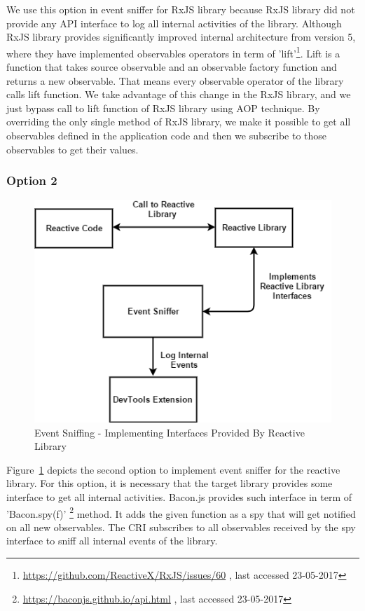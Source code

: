 We use this option in event sniffer for RxJS library because RxJS library did not provide any API interface to log all internal activities of the library.  
Although RxJS library provides significantly improved internal architecture from version 5, where they have implemented observables operators in term of 'lift'\footnote{\url{https://github.com/ReactiveX/RxJS/issues/60} , last accessed 23-05-2017}. Lift is a function that takes source observable and an observable factory function and returns a new observable. That means every observable operator of the library calls lift function. We take advantage of this change in the RxJS library, and we just bypass call to lift function of RxJS library using AOP technique. By overriding the only single method of RxJS library, we make it possible to get all observables defined in the application code and then we subscribe to those observables to get their values.



\subsubsection{Option 2}

\begin{figure}[!h]
	\centering
	\includegraphics[scale=0.5,trim=0 0 0 0]{gfx/EventSniffing2.png}
	\caption{Event Sniffing - Implementing Interfaces Provided By Reactive Library}
	\label{fig:event_sniffing_2}
\end{figure}

Figure~\ref{fig:event_sniffing_2} depicts the second option to implement event sniffer for the reactive library. For this option, it is necessary that the target library provides some interface to get all internal activities.
Bacon.js provides such interface in term of 'Bacon.spy(f)' \footnote{\url{https://baconjs.github.io/api.html} , last accessed 23-05-2017} method. 
It adds the given function as a spy that will get notified on all new observables. The CRI subscribes to all observables received by the spy interface to sniff all internal events of the library. 


